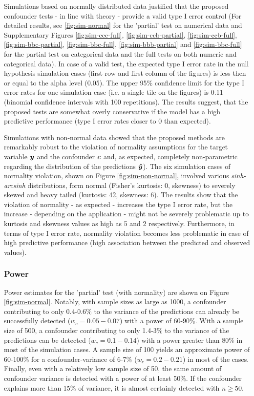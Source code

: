 \documentclass{article}
\begin{document}
Simulations based on normally distributed data justified that the proposed confounder tests - in line with theory - provide a valid type I error control (For detailed results, see \ref{fig:sim-normal} for the 'partial' test on numerical data and Supplementary Figures \ref{fig:sim-ccc-full}, \ref{fig:sim-ccb-partial}, \ref{fig:sim-ccb-full}, \ref{fig:sim-bbc-partial}, \ref{fig:sim-bbc-full}, \ref{fig:sim-bbb-partial} and \ref{fig:sim-bbc-full} for the partial test on categorical data and the full tests on both numeric and categorical data). 
In case of a valid test, the expected type I error rate in the null hypothesis simulation cases (first row and first column of the figures) is less then or equal to the alpha level (0.05). The upper 95\% confidence limit for the type I error rates for one simulation case (i.e. a single tile on the figures) is 0.11 (binomial confidence intervals with 100 repetitions). 
The results suggest, that the proposed tests are somewhat overly conservative if the model has a high predictive performance (type I error rates closer to 0 than expected).

Simulations with non-normal data showed that the proposed methods are remarkably robust to the violation of normality assumptions for the target variable $\boldsymbol{y}$ and the confounder $\boldsymbol{c}$ and, as expected, completely non-parametric regarding the distribution of the predictions $\boldsymbol{\hat{y}}$). The six simulation cases of normality violation, shown on Figure \ref{fig:sim-non-normal}, involved various \emph{sinh-arcsinh} distributions, form normal (Fisher's kurtosis: 0, skewness) to severely skewed and heavy tailed (kurtosis: 42, skewness: 6).
The results show that the violation of normality - as expected - increases the type I error rate, but the increase - depending on the application - might not be severely problematic up to kurtosis and skewness values as high as 5 and 2 respectively. Furthermore, in terms of type I error rate, normality violation becomes less problematic in case of high predictive performance (high association between the predicted and observed values).

\subsubsection*{Power}

Power estimates for the 'partial' test (with normality) are shown on Figure \ref{fig:sim-normal}. Notably, with sample sizes as large as 1000, a confounder contributing to only 0.4-0.6\% to the variance of the predictions can already be successfully detected ($w_c = 0.05 - 0.07$) with a power of 60-90\%. With a sample size of 500, a confounder contributing to only 1.4-3\% to the variance of the predictions can be detected ($w_c = 0.1 - 0.14$) with a power greater than 80\% in most of the simulation cases. A sample size of 100 yields an approximate power of 60-100\% for a confounder-variance of 6-7\% ($w_c = 0.2 - 0.21$) in most of the cases. Finally, even with a relatively low sample size of 50, the same amount of confounder variance is detected with a power of at least 50\%. If the confounder explains more than 15\% of variance, it is almost certainly detected with $n \geq 50$.
\end{document}
